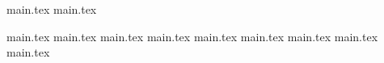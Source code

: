 \documentclass{dstu}
\begin{document}

{main.tex}
{main.tex}
\tableofcontents

\clearpage
{}
\pagestyle{fancy}
\setcounter{page}{8}
\clearpage

{main.tex}
{main.tex}
{main.tex}
{main.tex}
{main.tex}
{main.tex}
{main.tex}
{main.tex}
{main.tex}

\ifusebib
  \clearpage
  \printbibliography[title=Перелік посилань]
\fi
\end{document}
